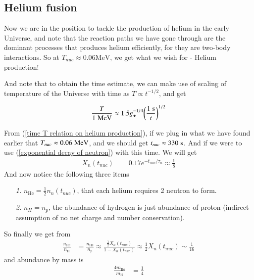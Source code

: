 \documentclass[a4paper, 12pt]{article}
\begin{document}
{{    \subsection{Helium fusion}%
      \label{sub:Helium fusion}

      Now we are in the position to tackle the production of helium
      in the early Universe, and note that the reaction paths we have
      gone through are the dominant processes that produces helium
      efficiently, for they are two-body interactions. So at \( T_{nuc}
      \approx 0.06 \mathrm{MeV}\), we get what we wish for - Helium
      production!

      And note that to obtain the time estimate, we can make use of
      scaling of temperature of the Universe with time as \( T
      \propto t^{-1/2}  \), and get 

      \begin{align}
        \label{time T relation on helium production}
        \frac{T}{1 \hspace{0.1cm} \mathrm{MeV}} \approx 1.5
        g_{\star}^{-1/4} \bigg(\frac{1
        \hspace{0.1cm}\mathrm{s}}{t} \bigg)^{1/2}  
      \end{align}

    From (\ref{time T relation on helium production}), if we plug in what
    we have found earlier that \( T_{nuc} \approx 0.06 \hspace{0.1cm}
    \mathrm{MeV} \), and we should get \( t_{nuc} \approx 330
    \hspace{0.1cm}\mathrm{s} \). And if we were to use
    (\ref{exponential decay of neutron}) with this time. We will get 
    \begin{align}
      \label{estimated abundance of neutron}
      X_{n}(t_{nuc}) &= 0.17 e^{-t_{nuc}/\tau_{n}} \approx
      \frac{1}{8}  
    \end{align}
    And now notice the following three items 
    \begin{enumerate}
      \item[\it 1.] \( n_{\mathrm{He}} = \frac{1}{2}
      n_{n}(t_{nuc}) \), that each helium requires 2 neutron to form. 
      \item[\it 2.] \( n_{H} = n_{p} \), the abundance of hydrogen
      is just abundance of proton (indirect assumption of no net charge
      and number conservation). 
    \end{enumerate}
    So finally we get from
    \begin{align}
      \label{abundance ratio}
      \frac{n_{\mathrm{He}}}{n_{\mathrm{H}}} &=
      \frac{n_{\mathrm{He}}}{n_{\mathrm{p}}} \approx
      \frac{\frac{1}{2} X_{n}(t_{nuc})}{1 - X_{n}(t_{nuc})}
      \approx \frac{1}{2} X_{n}(t_{nuc}) \sim \frac{1}{16}
    \end{align}
    and abundance by mass is 
    \begin{align}
      \label{abundance of helium by mass}
      \frac{4 m_{\mathrm{He}}}{m_{\mathrm{H}}} &=  \frac{1}{4} 
    \end{align}

}}
\end{document}

